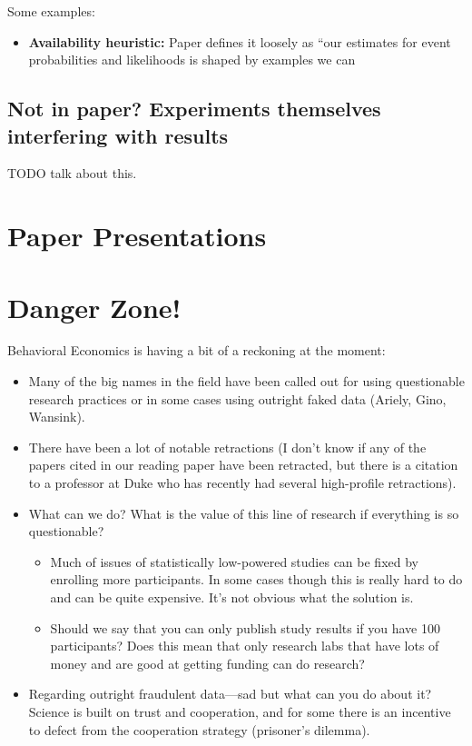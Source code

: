 \documentclass[11pt]{article}
\begin{document}
Some examples:
\begin{itemize}
    \item {\bf Availability heuristic:} Paper defines it loosely as ``our estimates for event probabilities and likelihoods is shaped by examples we can 
\end{itemize}

\subsection{Not in paper? Experiments themselves interfering with results}

TODO talk about this.

\section{Paper Presentations}


\section{Danger Zone!}

Behavioral Economics is having a bit of a reckoning at the moment:
\begin{itemize}
    \item Many of the big names in the field have been called out for using questionable research practices or in some cases using outright faked data (Ariely, Gino, Wansink).
    \item There have been a lot of notable retractions (I don't know if any of the papers cited in our reading paper have been retracted, but there is a citation to a professor at Duke who has recently had several high-profile retractions).
    \item What can we do? What is the value of this line of research if everything is so questionable?
    \begin{itemize}
        \item Much of issues of statistically low-powered studies can be fixed by enrolling more participants. In some cases though this is really hard to do and can be quite expensive. It's not obvious what the solution is. 
        \item Should we say that you can only publish study results if you have 100 participants? Does this mean that only research labs that have lots of money and are good at getting funding can do research?
    \end{itemize}
    \item Regarding outright fraudulent data---sad but what can you do about it? Science is built on trust and cooperation, and for some there is an incentive to defect from the cooperation strategy (prisoner's dilemma).
\end{itemize} 
\end{document}
